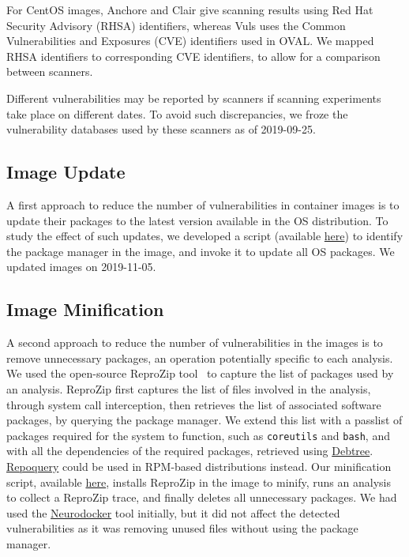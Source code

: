 \documentclass[a4paper,num-refs]{oup-contemporary}
\newcommand{\change}[2]{\color{cyan}Changes: #1\color{black}}
\newcommand{\reprozip}[0]{ReproZip\xspace}
\newcommand{\tristan}[1]{\color{red}From Tristan: #1\color{black}}
\begin{document}
For CentOS images, Anchore and Clair give scanning results using Red Hat
Security Advisory (RHSA) identifiers, whereas Vuls uses the Common
Vulnerabilities and Exposures (CVE) identifiers used in OVAL. We mapped
RHSA identifiers to corresponding CVE identifiers, to allow for a
comparison between scanners.

Different vulnerabilities may be reported by scanners if scanning
experiments take place on different dates. To avoid such discrepancies, we
froze the vulnerability databases used by these scanners as of 2019-09-25.

\subsection{Image Update}

A first approach to reduce the number of vulnerabilities in container
images is to update their packages to the latest version available in the OS
distribution. To study the effect of such updates, we developed a script
(available
\href{https://github.com/big-data-lab-team/container-vulnerabilities-paper/blob/master/Scripts/update}{here})
to identify the package manager in the image, and invoke it to update all
OS packages. We updated images on 2019-11-05.

\subsection{Image Minification}

A second approach to reduce the number of vulnerabilities in the images is
to remove unnecessary packages, an operation potentially specific to each
analysis. We used the open-source \reprozip tool~\cite{rampin2016reprozip}
to capture the list of packages used by an analysis. \reprozip first
captures the list of files involved in the analysis, through system call
interception, then retrieves the list of associated software packages, by
querying the package manager. We extend this list with a passlist of
packages required for the system to function, such as \texttt{coreutils}
and \texttt{bash}, and with all the dependencies of the required packages,
retrieved using
\href{http://manpages.ubuntu.com/manpages/xenial/man1/debtree.1.html}{Debtree}.
\href{https://linux.die.net/man/1/repoquery}{Repoquery} could be used in
RPM-based distributions instead. Our minification script, available
\href{https://github.com/big-data-lab-team/container-vulnerabilities-paper/tree/master/Scripts/minification}{here},
installs \reprozip in the image to minify, runs an analysis to collect a
\reprozip trace, and finally deletes all unnecessary packages. We had used
the \href{https://github.com/ReproNim/neurodocker}{Neurodocker} tool
initially, but it did not affect the detected vulnerabilities
as it was removing unused files without using the package manager.
\end{document}
